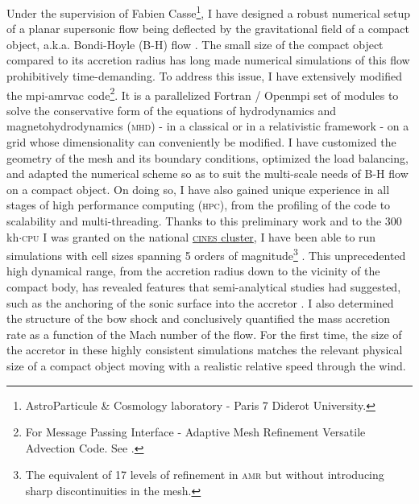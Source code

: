 \documentclass[a4paper,12pt,onecolumn]{article}
\begin{document}
\indent Under the supervision of Fabien Casse\footnote{AstroParticule \& Cosmology laboratory - Paris 7 Diderot University.}, I have designed a robust numerical setup of a planar supersonic flow being deflected by the gravitational field of a compact object, a.k.a. Bondi-Hoyle (B-H) flow \cite{Hoyle:1939fl,Bondi1944}. The small size of the compact object compared to its accretion radius has long made numerical simulations of this flow prohibitively time-demanding. To address this issue, I have extensively modified the {\sc mpi-amrvac} code\footnote{For Message Passing Interface - Adaptive Mesh Refinement Versatile Advection Code. See \cite{Porth:2014wv}.}. It is a parallelized Fortran / Open{\sc mpi} set of modules to solve the conservative form of the equations of hydrodynamics and magnetohydrodynamics (\textsc{mhd}) - in a classical or in a relativistic framework - on a grid whose dimensionality can conveniently be modified. I have customized the geometry of the mesh and its boundary conditions, optimized the load balancing, and adapted the numerical scheme so as to suit the multi-scale needs of B-H flow on a compact object. On doing so, I have also gained unique experience in all stages of high performance computing (\textsc{hpc}), from the profiling of the code to scalability and multi-threading. Thanks to this preliminary work and to the 300 kh$\cdot$\textsc{cpu} I was granted on the national \href{https://www.cines.fr/en/}{\textsc{cines} cluster}, I have been able to run simulations with cell sizes spanning 5 orders of magnitude\footnote{The equivalent of 17 levels of refinement in \textsc{amr} but without introducing sharp discontinuities in the mesh.} \cite{ElMellah2015}. This unprecedented high dynamical range, from the accretion radius down to the vicinity of the compact body, has revealed features that semi-analytical studies had suggested, such as the anchoring of the sonic surface into the accretor \cite{Foglizzo1996}. I also determined the structure of the bow shock and conclusively quantified the mass accretion rate as a function of the Mach number of the flow. For the first time, the size of the accretor in these highly consistent simulations matches the relevant physical size of a compact object moving with a realistic relative speed through the wind. \\
\end{document}
